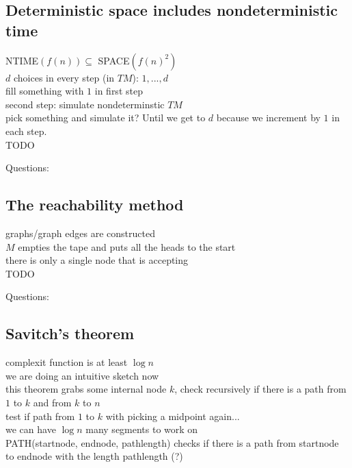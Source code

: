 \documentclass[a4]{scrartcl}
\begin{document}
\subsection*{Deterministic space includes nondeterministic time}
NTIME$(f(n)) \subseteq$ SPACE$(f(n)^2)$ \\
$d$ choices in every step (in $TM$): $1,...,d$ \\
fill something with $1$ in first step \\
second step: simulate nondeterminstic $TM$ \\
pick something and simulate it? %
Until we get to $d$ because we increment by $1$ in each step. \\



\color{red} TODO
\color{black}

\color{violet} Questions:
\color{black}





\subsection*{The reachability method}
graphs/graph edges are constructed \\
$M$ empties the tape and puts all the heads to the start \\
there is only a single node that is accepting \\



\color{red} TODO
\color{black}

\color{violet} Questions:
\color{black}



\subsection*{Savitch's theorem}
complexit function is at least $\log n$ \\
we are doing an intuitive sketch now \\
this theorem grabs some internal node $k$, check recursively if there is a path from $1$ to $k$ and from $k$ to $n$ \\
test if path from $1$ to $k$ with picking a midpoint again... \\
we can have $\log n$ many segments to work on \\
PATH(startnode, endnode, pathlength) checks if there is a path from startnode to endnode with the length pathlength (?) \\
\end{document}
